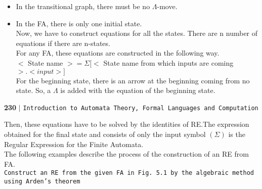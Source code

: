 \documentclass[9pt]{article}
\begin{document}
\vspace*{0.1cm}
\begin{itemize}
  \item In the transitional graph, there must be no $\Lambda$-move.\\
  \item In the FA, there is only one initial state.\\

  \vspace*{0.1cm}
\hspace*{0.5cm} Now, we have to construct equations for all the states. There are n number of equations if there are
n-states.\\
\hspace*{0.5cm} For any FA, these equations are constructed in the following way.\\

\vspace*{0.1cm}
\hspace*{1cm} $<$ State name $> = \Sigma [<$ State name from which inputs are coming $>. < input >]$ \\

\vspace*{0.1cm}
For the beginning state, there is an arrow at the beginning coming from no state. So, a $\Lambda$ is added with
the equation of the beginning state.\\
\end{itemize}

\newpage
\begin{flushleft}
    \textbf{230}\hspace*{0.1cm} \textbf{$|$} \hspace*{0.1cm} \texttt{Introduction to Automata Theory, Formal Languages and Computation}
  \end{flushleft}

\vspace*{0.3cm}

\hspace*{0.5cm} Then, these equations have to be solved by the identities of RE.The expression obtained for the final
state and consists of only the input symbol $(\Sigma)$ is the Regular Expression for the Finite Automata.\\
\hspace*{0.5cm} The following examples describe the process of the construction of an RE from FA.\\

\hspace*{0.1cm} \texttt{\small{Construct an RE from the given FA in Fig. 5.1 by the algebraic method using Arden’s theorem}} \\
\end{document}
